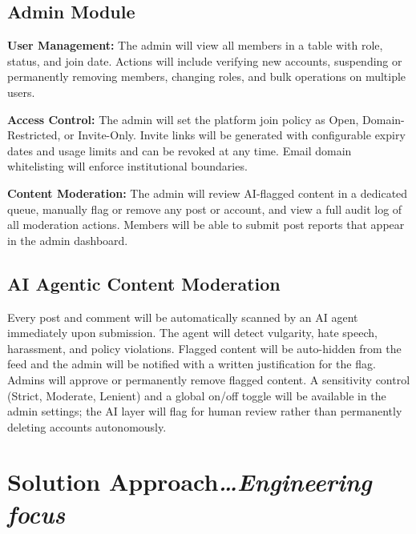 \documentclass[11pt,a4paper]{article}
\newcommand{\BvrHint}[1]{{\normalfont\normalsize\itshape\hfill #1}}
\begin{document}
\subsection{Admin Module}

\textbf{User Management:} The admin will view all members in a table with role, status, and join date. Actions will include verifying new accounts, suspending or permanently removing members, changing roles, and bulk operations on multiple users.

\textbf{Access Control:} The admin will set the platform join policy as Open, Domain-Restricted, or Invite-Only. Invite links will be generated with configurable expiry dates and usage limits and can be revoked at any time. Email domain whitelisting will enforce institutional boundaries.

\textbf{Content Moderation:} The admin will review AI-flagged content in a dedicated queue, manually flag or remove any post or account, and view a full audit log of all moderation actions. Members will be able to submit post reports that appear in the admin dashboard.

\subsection{AI Agentic Content Moderation}
Every post and comment will be automatically scanned by an AI agent immediately upon submission. The agent will detect vulgarity, hate speech, harassment, and policy violations. Flagged content will be auto-hidden from the feed and the admin will be notified with a written justification for the flag. Admins will approve or permanently remove flagged content. A sensitivity control (Strict, Moderate, Lenient) and a global on/off toggle will be available in the admin settings; the AI layer will flag for human review rather than permanently deleting accounts autonomously.

\section{Solution Approach\BvrHint{\ldots Engineering focus}}
\end{document}
